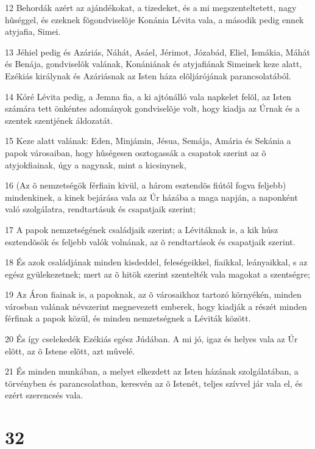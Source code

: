 \par 12 Behordák azért az ajándékokat, a tizedeket, és a mi megszenteltetett, nagy hûséggel, és ezeknek fõgondviselõje Konánia Lévita vala, a második pedig ennek atyjafia, Simei.
\par 13 Jéhiel pedig és Azáriás, Náhát, Asáel, Jérimot, Józabád, Eliel, Ismákia, Máhát és Benája, gondviselõk valának, Konániának és atyjafiának Simeinek keze alatt, Ezékiás királynak és Azáriásnak az Isten háza elõljárójának parancsolatából.
\par 14 Kóré Lévita pedig, a Jemna fia, a ki ajtónálló vala napkelet felõl, az Isten számára tett önkéntes adományok gondviselõje volt, hogy kiadja az Úrnak és a szentek szentjének áldozatát.
\par 15 Keze alatt valának: Eden, Minjámin, Jésua, Semája, Amária és Sekánia a papok városaiban, hogy hûségesen osztogassák a csapatok szerint az õ atyjokfiainak, úgy a nagynak, mint a kicsinynek,
\par 16 (Az õ nemzetségök férfiain kivül, a három esztendõs fiútól fogva feljebb) mindenkinek, a kinek bejárása vala az Úr házába a maga napján, a naponként való szolgálatra, rendtartásuk és csapatjaik szerint;
\par 17 A papok nemzetségének családjaik szerint; a Lévitáknak is, a kik húsz esztendõsök és feljebb valók volnának, az õ rendtartások és csapatjaik szerint.
\par 18 És azok családjának minden kisdeddel, feleségeikkel, fiaikkal, leányaikkal, s az egész gyülekezetnek; mert az õ hitök szerint szentelték vala magokat a szentségre;
\par 19 Az Áron fiainak is, a papoknak, az õ városaikhoz tartozó környékén, minden városban valának névszerint megnevezett emberek, hogy kiadják a részét minden férfinak a papok közül, és minden nemzetségnek a Léviták között.
\par 20 És így cselekedék Ezékiás egész Júdában. A mi jó, igaz és helyes vala az Úr elõtt, az õ Istene elõtt, azt mûvelé.
\par 21 És minden munkában, a melyet elkezdett az Isten házának szolgálatában, a törvényben és parancsolatban, keresvén az õ Istenét, teljes szívvel jár vala el, és ezért szerencsés vala.

\chapter{32}

